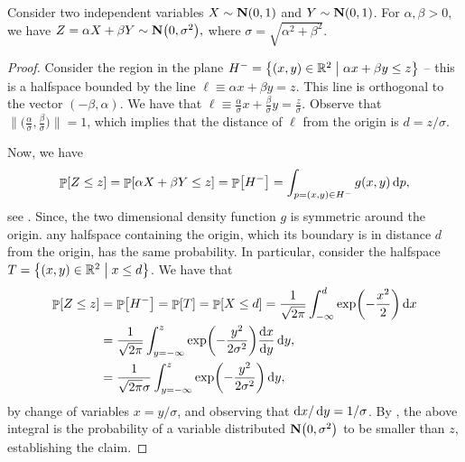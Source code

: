 \begin{lemma}
    Consider two independent variables $X \sim \NormalY{0}{1}$ and
    $Y \sim \NormalY{0}{1}$. For $\alpha,\beta > 0$, we have
    \begin{math}
        Z = \alpha X+\beta Y \sim \NormalY{ 0}{ \sigma^2},
    \end{math}
    where $\sigma = \sqrt{\alpha^2 + \beta^2}$.
\end{lemma}
\begin{proof}
    Consider the region in the plane
    $H^- = \left\{  (x,y)\in\mathbb{R}^2 \;\middle\vert\;  \alpha x + \beta y \leq z \right\}$ -- this
    is a halfspace bounded by the line
    $\ell \equiv \alpha x + \beta y = z $. This line is orthogonal to
    the vector $(-\beta,\alpha)$. We have that
    $\ell \equiv \frac{\alpha}{\sigma} x + \frac{\beta}{\sigma} y =
    \frac{z}{\sigma} $. Observe that
    $\bigl\|\bigl( \frac{\alpha}{\sigma}, \frac{\beta}{\sigma}
    \bigr)\bigr\|=1$, which implies that the distance of $\ell$ from
    the origin is $d = z/\sigma$.

    Now, we have
    \begin{equation*}
        \Prob{Z \leq z}%
        =%
        \Prob{\alpha X + \beta Y \leq z}
        =%
        \Prob{H^-}%
        =%
        \int_{p=(x,y)\in H^-} g(x,y) \diffX{p},
    \end{equation*}
    see .  Since, the two dimensional density
    function $g$ is symmetric around the origin. any halfspace
    containing the origin, which its boundary is in distance $d$ from
    the origin, has the same probability. In particular, consider the
    halfspace $T=\left\{  (x,y)\in\mathbb{R}^2 \;\middle\vert\;  x \leq d \right\}$. We have that
    \begin{align*}
      \Prob{Z \leq z}%
      &=%
        \Prob{H^-}%
        =%
        \Prob{T}%
        =%
        \Prob{X \leq d} %
        =%
        \frac{1}{\sqrt{2\pi}}\int_{-\infty}^d \exp\pth{-\frac{x^2}{2}} \diffX{x}
      \\&%
      =%
      \frac{1}{\sqrt{2\pi } }\int_{y=-\infty}^z
      \exp\pth{-\frac{y^2}{2\sigma^2}} \frac{\diffX{x}}{ \diffX{y}} \diffX{y},
      \\&%
      =%
      \frac{1}{\sqrt{2\pi } \sigma}\int_{y=-\infty}^z
      \exp\pth{-\frac{y^2}{2\sigma^2}}  \diffX{y},
    \end{align*}
    by change of variables $x = y/\sigma$, and observing that
    $\mathop{}\!\mathrm{d}x / \mathop{}\!\mathrm{d}y = 1/\sigma$. By ,
    the above integral is the probability of a variable distributed
    $\NormalY{0}{\sigma^2}$ to be smaller than $z$, establishing the
    claim.
\end{proof}

